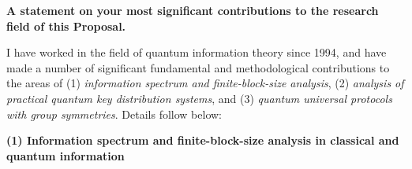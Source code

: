 \begin{thebibliography}{99}
\begin{itemize}

\end{itemize}
\vspace{3 mm}



\end{thebibliography}


\newpage
\textbf{A statement on your most significant contributions to the research field of this Proposal.}



I have worked in the field of quantum information theory since 1994, and have made a number of significant fundamental and methodological contributions to the areas of 
(1) \textit{information spectrum and finite-block-size analysis}, 
(2) \textit{analysis of practical quantum key distribution systems}, 
and (3) \textit{quantum universal protocols with group symmetries}.
Details follow below:

\textbf{(1) Information spectrum and finite-block-size analysis in classical and quantum information}

